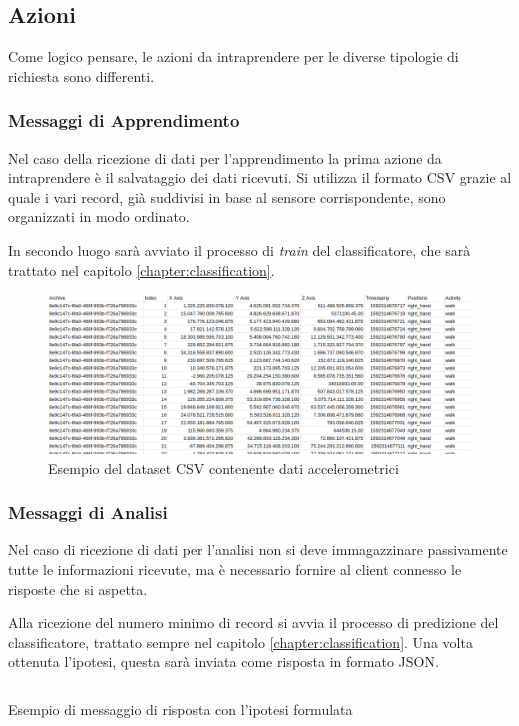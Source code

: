 \newpage
\subsection{Azioni}
Come logico pensare, le azioni da intraprendere per le diverse tipologie di richiesta sono differenti. 

\subsubsection{Messaggi di Apprendimento}
Nel caso della ricezione di dati per l'apprendimento la prima azione da intraprendere è il salvataggio dei dati ricevuti.
Si utilizza il formato CSV grazie al quale i vari record, già suddivisi in base al sensore corrispondente, sono organizzati in modo ordinato. 

In secondo luogo sarà avviato il processo di \textit{train} del classificatore, che sarà trattato nel capitolo \ref{chapter:classification}.
\begin{figure}[H]
    \centering
    \includegraphics[scale = 0.39]{assets/images/examples/dataset-data-example.png}
    \caption{Esempio del dataset CSV contenente dati accelerometrici}
    \label{fig:example-dataset-csv-accelerometer}
\end{figure}


\subsubsection{Messaggi di Analisi}
Nel caso di ricezione di dati per l'analisi non si deve immagazzinare passivamente tutte le informazioni ricevute, ma è necessario fornire
al client connesso le risposte che si aspetta.

Alla ricezione del numero minimo di record si avvia il processo di predizione del classificatore, trattato sempre nel capitolo \ref{chapter:classification}.
Una volta ottenuta l'ipotesi, questa sarà inviata come risposta in formato JSON.

\begin{listing}[H] 
    \inputminted[frame=single,framesep=10pt]{json}{assets/snippets/server/receiver/prediction.json}
    \caption{Esempio di messaggio di risposta con l'ipotesi formulata}
\end{listing}